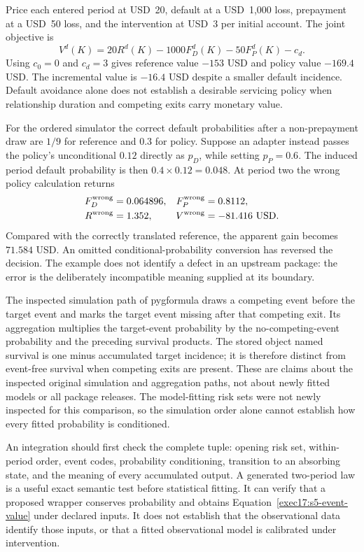 Price each entered period at USD~20, default at a USD~1,000 loss, prepayment
at a USD~50 loss, and the intervention at USD~3 per initial account. The
joint objective is
\begin{equation}
 V^d(K)=20R^d(K)-1000F_D^d(K)-50F_P^d(K)-c_d.
 \label{exec17:s5-event-value}
\end{equation}
Using $c_0=0$ and $c_d=3$ gives reference value $-153$ USD and policy value
$-169.4$ USD. The incremental value is $-16.4$ USD despite a smaller default
incidence. Default avoidance alone does not establish a desirable servicing
policy when relationship duration and competing exits carry monetary value.

For the ordered simulator the correct default probabilities after a
non-prepayment draw are $1/9$ for reference and $0.3$ for policy. Suppose an
adapter instead passes the policy's unconditional $0.12$ directly as $p_D$,
while setting $p_P=0.6$. The induced period default probability is then
$0.4\times0.12=0.048$. At period two the wrong policy calculation returns
\begin{align}
 F_D^{\rm wrong}&=0.064896,&F_P^{\rm wrong}&=0.8112,\notag\\
 R^{\rm wrong}&=1.352,&V^{\rm wrong}&=-81.416\ \mathrm{USD}.
 \label{exec17:s5-ordered-error}
\end{align}
Compared with the correctly translated reference, the apparent gain becomes
$71.584$ USD. An omitted conditional-probability conversion has reversed the
decision. The example does not identify a defect in an upstream package: the
error is the deliberately incompatible meaning supplied at its boundary.
\citep{exec17_s5_math}

The inspected simulation path of pygformula draws a competing event before
the target event and marks the target event missing after that competing
exit. Its aggregation multiplies the target-event probability by the
no-competing-event probability and the preceding survival products. The
stored object named survival is one minus accumulated target incidence;
it is therefore distinct from event-free survival when competing exits are
present. These are claims about the inspected original simulation and
aggregation paths, not about newly fitted models or all package releases.
The model-fitting risk sets were not newly inspected for this comparison,
so the simulation order alone cannot establish how every fitted probability
is conditioned.\citep{v13_sw_pygformula,exec17_s5_paths}

An integration should first check the complete tuple: opening risk set,
within-period order, event codes, probability conditioning, transition to an
absorbing state, and the meaning of every accumulated output. A generated
two-period law is a useful exact semantic test before statistical fitting.
It can verify that a proposed wrapper conserves probability and obtains
Equation~\eqref{exec17:s5-event-value} under declared inputs. It does not
establish that the observational data identify those inputs, or that a
fitted observational model is calibrated under intervention.

